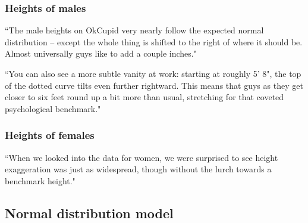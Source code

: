 \documentclass[slidestop,compress,mathserif]{beamer}
\begin{document}
\begin{frame}
\frametitle{Heights of males}

{
\pause
{\footnotesize``The male heights on OkCupid very nearly follow the expected normal distribution -- except the whole thing is shifted to the right of where it should be. Almost universally guys like to add a couple inches." 

``You can also see a more subtle vanity at work: starting at roughly 5' 8", the top of the dotted curve tilts even further rightward. This means that guys as they get closer to six feet round up a bit more than usual, stretching for that coveted psychological benchmark."
}
}


\end{frame}


\begin{frame}
\frametitle{Heights of females}

{
\pause
{\footnotesize ``When we looked into the data for women, we were surprised to see height exaggeration was just as widespread, though without the lurch towards a benchmark height."
}
}

\vfill


\end{frame}


\subsection{Normal distribution model}



\end{document}
